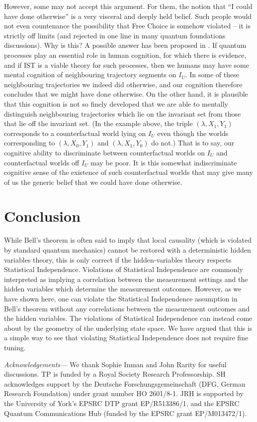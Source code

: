 \documentclass[12pt,superscriptaddress]{revtex4-2}
\begin{document}
However, some may not accept this argument. For them, the notion that “I could have done otherwise” is a very visceral and deeply held belief. Such people would not even countenance the possibility that Free Choice is somehow violated -- it is strictly off limits (and rejected in one line in many quantum foundations discussions). Why is this? A possible answer has been proposed in \cite{Palmer2020Brain}. If quantum processes play an essential role in human cognition, for which there is evidence, and if IST is a viable theory for such processes, then we humans may have some mental cognition of neighbouring trajectory segments on $I_U$. In some of these neighbouring trajectories we indeed did otherwise, and our cognition therefore concludes that we might have done otherwise. On the other hand, it is plausible that this cognition is not so finely developed that we are able to mentally distinguish neighbouring trajectories which lie on the invariant set from those that lie off the invariant set. (In the example above, the triple $(\lambda, X_1, Y_1)$ corresponds to a counterfactual world lying on $I_U$ even though the worlds corresponding to $(\lambda, X_0, Y_1)$ and $(\lambda, X_1, Y_0)$ do not.) That is to say, our cognitive ability to discriminate between counterfactual worlds on $I_U$ and counterfactual worlds off $I_U$ may be poor. It is this somewhat indiscriminate cognitive sense of the existence of such counterfactual worlds that may give many of us the generic belief that we could have done otherwise. 

\section{Conclusion}

While Bell's theorem is often said to imply that local causality (which is violated by standard quantum mechanics) cannot be restored with a deterministic hidden variables theory, this is only correct if the hidden-variables theory respects Statistical Independence. Violations of Statistical Independence are commonly interpreted as implying a correlation between the measurement settings and the hidden variables which determine the measurement outcomes. However, as we have shown here, one can violate the Statistical Independence assumption in Bell's theorem without any correlations between the measurement outcomes and the hidden variables. The violations of Statistical Independence can instead come about by the geometry of the underlying state space. We have argued that this is a simple way to see that violating Statistical Independence does not require fine tuning.

\bigskip

\textit{Acknowledgements---}
We thank Sophie Inman and John Rarity for useful discussions. TP is funded by a Royal Society Research Professorship. SH acknowledges support by the Deutsche Forschungsgemeinschaft (DFG, German Research Foundation) under grant number HO 2601/8-1. JRH is supported by the University of York's EPSRC DTP grant EP/R513386/1, and the EPSRC Quantum Communications Hub (funded by the EPSRC grant EP/M013472/1).



\end{document}
